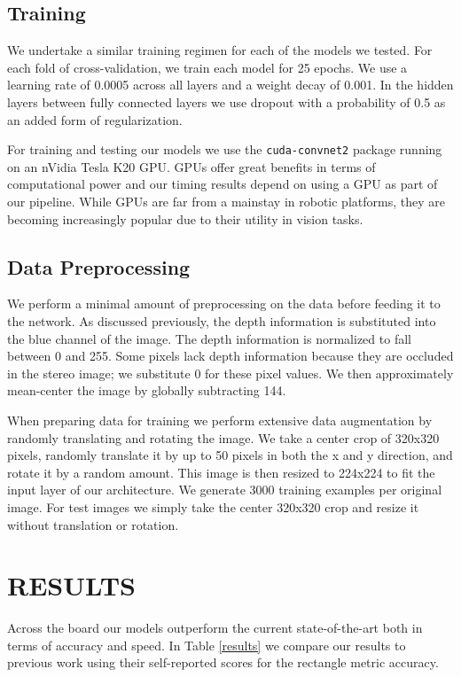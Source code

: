 \documentclass[letterpaper, 10 pt, conference]{ieeeconf}
\begin{document}
\subsection{Training}

We undertake a similar training regimen for each of the models we tested. For each fold of cross-validation, we train each model for 25 epochs. We use a learning rate of 0.0005 across all layers and a weight decay of 0.001. In the hidden layers between fully connected layers we use dropout with a probability of 0.5 as an added form of regularization.

For training and testing our models we use the \texttt{cuda-convnet2} package running on an nVidia Tesla K20 GPU. GPUs offer great benefits in terms of computational power and our timing results depend on using a GPU as part of our pipeline. While GPUs are far from a mainstay in robotic platforms, they are becoming increasingly popular due to their utility in vision tasks.

\subsection{Data Preprocessing}

We perform a minimal amount of preprocessing on the data before feeding it to the network. As discussed previously, the depth information is substituted into the blue channel of the image. The depth information is normalized to fall between 0 and 255. Some pixels lack depth information because they are occluded in the stereo image; we substitute 0 for these pixel values. We then approximately mean-center the image by globally subtracting 144.

When preparing data for training we perform extensive data augmentation by randomly translating and rotating the image. We take a center crop of 320x320 pixels, randomly translate it by up to 50 pixels in both the x and y direction, and rotate it by a random amount. This image is then resized to 224x224 to fit the input layer of our architecture. We generate 3000 training examples per original image. For test images we simply take the center 320x320 crop and resize it without translation or rotation.

\section{RESULTS}

Across the board our models outperform the current state-of-the-art both in terms of accuracy and speed. In Table \ref{results} we compare our results to previous work using their self-reported scores for the rectangle metric accuracy. 
\end{document}
